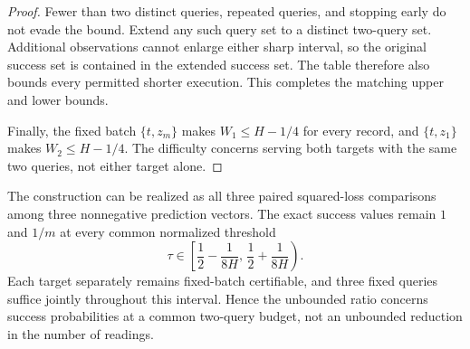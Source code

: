 \begin{proof}
Fewer than two distinct queries, repeated queries, and stopping early do
not evade the bound. Extend any such query set to a distinct two-query
set. Additional observations cannot enlarge either sharp interval, so the
original success set is contained in the extended success set. The table
therefore also bounds every permitted shorter execution. This completes
the matching upper and lower bounds.

Finally, the fixed batch $\{t,z_m\}$ makes $W_1\leq H-1/4$ for every
record, and $\{t,z_1\}$ makes $W_2\leq H-1/4$. The difficulty concerns
serving both targets with the same two queries, not either target alone.
\end{proof}

\begin{corollary}
\label{cor:all-pairs-collapse}
The construction can be realized as all three paired squared-loss
comparisons among three nonnegative prediction vectors. The exact success
values remain $1$ and $1/m$ at every common normalized threshold
\[
 \tau\in\left[\frac12-\frac1{8H},\,
                    \frac12+\frac1{8H}\right).
\]
Each target separately remains fixed-batch certifiable, and three fixed
queries suffice jointly throughout this interval. Hence the unbounded
ratio concerns success probabilities at a common two-query budget, not
an unbounded reduction in the number of readings.
\end{corollary}

